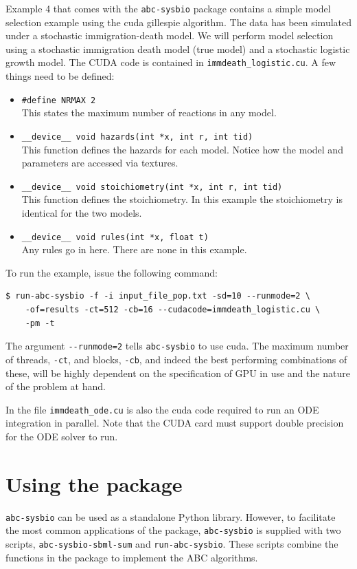 \documentclass[a4paper]{report}
\begin{document}
Example 4 that comes with the \verb$abc-sysbio$ package contains a simple model selection example using the cuda gillespie algorithm. The data has been simulated under a stochastic immigration-death model. We will perform model selection using a stochastic immigration death model (true model) and a stochastic logistic growth model. The CUDA code is contained in \verb$immdeath_logistic.cu$. A few things need to be defined:
\begin{itemize}
\item \verb$#define NRMAX 2$ \\
This states the maximum number of reactions in any model.

\item
\verb$__device__ void hazards(int *x, int r, int tid)$ \\
This function defines the hazards for each model. Notice how the model and parameters are accessed via textures.

\item 
\verb$__device__ void stoichiometry(int *x, int r, int tid)$ \\
This function defines the stoichiometry. In this example the stoichiometry is identical for the two models.

\item
\verb$__device__ void rules(int *x, float t)$ \\
Any rules go in here. There are none in this example.

\end{itemize}

To run the example, issue the following command:
\begin{verbatim}
$ run-abc-sysbio -f -i input_file_pop.txt -sd=10 --runmode=2 \
	-of=results -ct=512 -cb=16 --cudacode=immdeath_logistic.cu \
	-pm -t
\end{verbatim}

The argument \verb$--runmode=2$ tells \verb$abc-sysbio$ to use cuda.
The maximum number of threads, \verb$-ct$, and blocks,  \verb$-cb$, and indeed the best performing combinations of these, will be highly dependent on the specification of GPU in use and the nature of the problem at hand.

In the file \verb$immdeath_ode.cu$ is also the cuda code required to run an ODE integration in parallel. Note that the CUDA card must support double precision for the ODE solver to run.

\chapter{Using the package}
\label{usage}
\verb$abc-sysbio$ can be used as a standalone Python library. However, to facilitate the most common applications of the package, \verb$abc-sysbio$ is supplied with two scripts, \verb$abc-sysbio-sbml-sum$ and \verb$run-abc-sysbio$. These scripts combine the functions in the package to implement the ABC algorithms.
\end{document}

